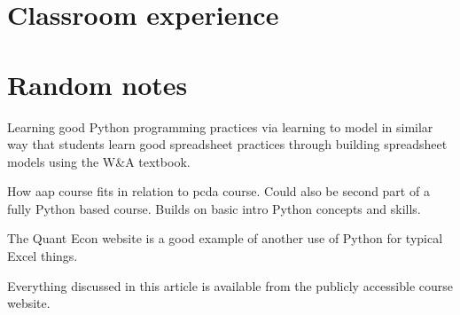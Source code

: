 \documentclass[ited,blindrev]{informs3}              %
\begin{document}
\section{Classroom experience}

\section{Random notes}
Learning good Python programming practices via learning to model in similar way that students learn good spreadsheet practices through building spreadsheet models using the W\&A textbook.

How aap course fits in relation to pcda course. Could also be second part of a fully Python based course. Builds on basic intro Python concepts and skills.

The Quant Econ website is a good example of another use of Python for typical Excel things.

Everything discussed in this article is available from the publicly accessible course website.

\ACKNOWLEDGMENT{%
}%


%
%
%




\end{document}
